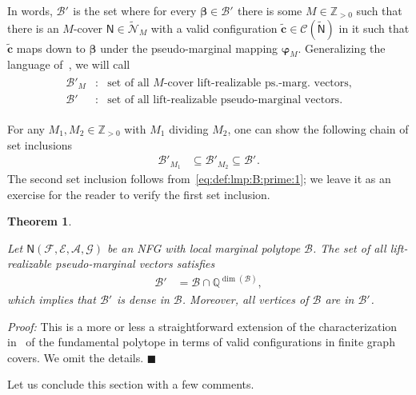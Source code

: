 \documentclass[journal, twocolumn]{IEEEtran}
\renewcommand{\mathbf}[1]{{\bm{#1}}}
\newcommand{\Z}{\mathbb{Z}}
\newcommand{\Zpp}{\Z_{>0}}
\newcommand{\vect}[1]{\mathbf{#1}}
\newcommand{\code}[1]{\mathcal{#1}}
\newcommand{\set}[1]{\mathcal{#1}}
\newcommand{\graph}[1]{\mathsf{#1}}
\newcommand{\codeCedge}{\code{C}}
\newcommand{\bel}{\beta}
\newcommand{\vbel}{\boldsymbol{\bel}}
\newcommand{\setA}{\set{A}}
\newcommand{\setE}{\set{E}}
\newcommand{\setF}{\set{F}}
\newcommand{\setG}{\set{G}}
\newcommand{\cvc}{\vect{\cover{c}}}
\newcommand{\lmpB}{\mathcal{B}}
\newcommand{\lmpBdown}[1]{\mathcal{B}'_{#1}}
\newcommand{\graphN}{\graph{N}}
\newcommand{\cover}[1]{\tilde{#1}}
\newcommand{\cset}[1]{\cover{\set{#1}}}
\newcommand{\cgraph}[1]{\cover{\graph{#1}}}
\newcommand{\?}{\mathrm{?}}
\newcommand{\varphiM}{\boldsymbol{\varphi}_{M}}
\newcommand{\qedblack}{\hspace*{\fill}%
  $\blacksquare$\smallskip}
\newtheorem{Theorem}[Lemma]{Theorem}
\newenvironment{Proof}%
  {\noindent \emph{Proof:}}{\qedblack}
\begin{document}
In words, $\lmpBdown{}$ is the set where for every $\vbel \in \lmpBdown{}$ there is some
$M \in \Zpp$ such that there is an $M$-cover $\graphN \in \cset{N}_M$ with a
valid configuration $\cvc \in \codeCedge(\cgraph{N})$ in it such that $\cvc$
maps down to $\vbel$ under the pseudo-marginal mapping
$\varphiM$. Generalizing the language of~\cite{Kelley:Sridhara:07:1}, we will
call
\begin{align*}
  \begin{array}{lcl}
    \lmpBdown{M} & \!\!\!\!: & \text{set of all $M$-cover lift-realizable 
                                     ps.-marg.\ vectors,} \\
    \lmpBdown{}   & \!\!\!\!: & \text{set of all lift-realizable
                                     pseudo-marginal vectors.}
  \end{array}
\end{align*}


For any $M_1, M_2 \in \Zpp$ with $M_1$ dividing $M_2$, one can show the following
chain of set inclusions
\begin{align*}
  \lmpBdown{M_1}
    &\subseteq
       \lmpBdown{M_2}
     \subseteq
       \lmpBdown{}.
\end{align*}
The second set inclusion follows from~\eqref{eq:def:lmp:B:prime:1}; we leave
it as an exercise for the reader to verify the first set inclusion.


\begin{Theorem}
  \label{theorem:down:projection:1}

  Let $\graphN(\setF,\setE, \setA, \setG)$ be an NFG with local marginal
  polytope $\lmpB$. The set of all lift-realizable pseudo-marginal vectors 
  satisfies
  \begin{align*}
    \lmpBdown{}
      &= \lmpB \cap \mathbb{Q}^{\operatorname{dim}(\lmpB)},
  \end{align*}
  which implies that $\lmpBdown{}$ is dense in $\lmpB$. Moreover, all vertices of
  $\lmpB$ are in $\lmpBdown{}$.
\end{Theorem}


\begin{Proof}
  This is a more or less a straightforward extension of the characterization
  in~\cite{Koetter:Vontobel:03:1, Vontobel:Koetter:05:1:subm} of the
  fundamental polytope in terms of valid configurations in finite graph
  covers. We omit the details.
\end{Proof}


Let us conclude this section with a few comments.
\end{document}
